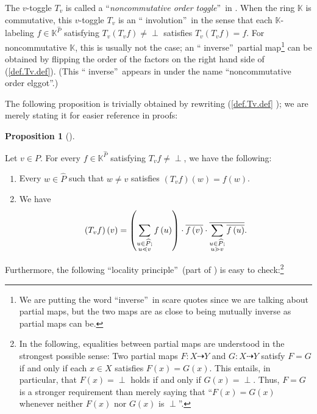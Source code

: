\documentclass[numbers=enddot,12pt,final,onecolumn,notitlepage]{scrartcl}%
\theoremstyle{definition}
\newtheorem{prop}[theo]{Proposition}
\newenvironment{proposition}[1][]
{\begin{prop}[#1]\begin{leftbar}}
{\end{leftbar}\end{prop}}
\newcommand{\undf}{\operatorname*{\bot}}
\let\sumnonlimits\sum
\renewcommand{\sum}{\sumnonlimits\limits}
\begin{document}
The $v$-toggle $T_{v}$ is called a \textquotedblleft\emph{noncommutative order
toggle}\textquotedblright\ in \cite[Definition 5.6]{JosRob20}. When the ring
$\mathbb{K}$ is commutative, this $v$-toggle $T_{v}$ is an \textquotedblleft
involution\textquotedblright\ in the sense that each $\mathbb{K}$-labeling
$f\in\mathbb{K}^{\widehat{P}}$ satisfying $T_{v}\left(  T_{v}f\right)
\neq\undf$ satisfies $T_{v}\left(  T_{v}f\right)  =f$. For noncommutative
$\mathbb{K}$, this is usually not the case; an \textquotedblleft
inverse\textquotedblright\ partial map\footnote{We are putting the word
\textquotedblleft inverse\textquotedblright\ in scare quotes since we are
talking about partial maps, but the two maps are as close to being mutually
inverse as partial maps can be.} can be obtained by flipping the order of the
factors on the right hand side of (\ref{def.Tv.def}). (This \textquotedblleft
inverse\textquotedblright\ appears in \cite{JosRob20} under the name
\textquotedblleft noncommutative order elggot\textquotedblright.)

The following proposition is trivially obtained by rewriting (\ref{def.Tv.def}%
); we are merely stating it for easier reference in proofs:

\begin{proposition}
\label{prop.Tv}Let $v\in P$. For every $f\in\mathbb{K}^{\widehat{P}}$
satisfying $T_{v}f\neq\undf$, we have the following:

\begin{enumerate}
\item[\textbf{(a)}] Every $w\in\widehat{P}$ such that $w\neq v$ satisfies
$\left(  T_{v}f\right)  \left(  w\right)  =f\left(  w\right)  $.

\item[\textbf{(b)}] We have%
\[
\left(  T_{v}f\right)  \left(  v\right)  =\left(  \sum\limits_{\substack{u\in
\widehat{P};\\u\lessdot v}}f\left(  u\right)  \right)  \cdot\overline{f\left(
v\right)  }\cdot\overline{\sum\limits_{\substack{u\in\widehat{P};\\u\gtrdot
v}}\overline{f\left(  u\right)  }}.
\]

\end{enumerate}
\end{proposition}

Furthermore, the following \textquotedblleft locality
principle\textquotedblright\ (part of \cite[Proposition 5.8]{JosRob20}) is
easy to check:\footnote{In the following, equalities between partial maps are
understood in the strongest possible sense: Two partial maps
$F:X\dashrightarrow Y$ and $G:X\dashrightarrow Y$ satisfy $F=G$ if and only if
each $x\in X$ satisfies $F\left(  x\right)  =G\left(  x\right)  $. This
entails, in particular, that $F\left(  x\right)  =\undf$ holds if and only if
$G\left(  x\right)  =\undf$. Thus, $F=G$ is a stronger requirement than merely
saying that \textquotedblleft$F\left(  x\right)  =G\left(  x\right)  $
whenever neither $F\left(  x\right)  $ nor $G\left(  x\right)  $ is
$\undf$\textquotedblright.}
\end{document}
